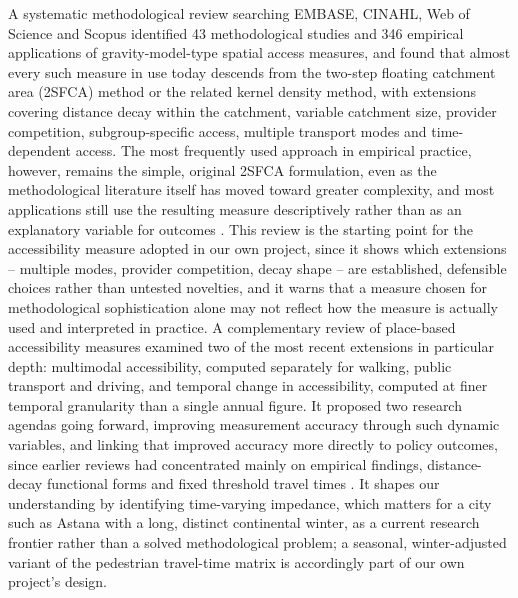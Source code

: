 \documentclass[journal]{IEEEtran}
\begin{document}
A systematic methodological review searching EMBASE, CINAHL, Web of Science and Scopus identified 43 methodological studies and 346 empirical applications of gravity-model-type spatial access measures, and found that almost every such measure in use today descends from the two-step floating catchment area (2SFCA) method or the related kernel density method, with extensions covering distance decay within the catchment, variable catchment size, provider competition, subgroup-specific access, multiple transport modes and time-dependent access. The most frequently used approach in empirical practice, however, remains the simple, original 2SFCA formulation, even as the methodological literature itself has moved toward greater complexity, and most applications still use the resulting measure descriptively rather than as an explanatory variable for outcomes \cite{stacherl2023}. This review is the starting point for the accessibility measure adopted in our own project, since it shows which extensions -- multiple modes, provider competition, decay shape -- are established, defensible choices rather than untested novelties, and it warns that a measure chosen for methodological sophistication alone may not reflect how the measure is actually used and interpreted in practice. A complementary review of place-based accessibility measures examined two of the most recent extensions in particular depth: multimodal accessibility, computed separately for walking, public transport and driving, and temporal change in accessibility, computed at finer temporal granularity than a single annual figure. It proposed two research agendas going forward, improving measurement accuracy through such dynamic variables, and linking that improved accuracy more directly to policy outcomes, since earlier reviews had concentrated mainly on empirical findings, distance-decay functional forms and fixed threshold travel times \cite{park2021}. It shapes our understanding by identifying time-varying impedance, which matters for a city such as Astana with a long, distinct continental winter, as a current research frontier rather than a solved methodological problem; a seasonal, winter-adjusted variant of the pedestrian travel-time matrix is accordingly part of our own project's design.
\end{document}
